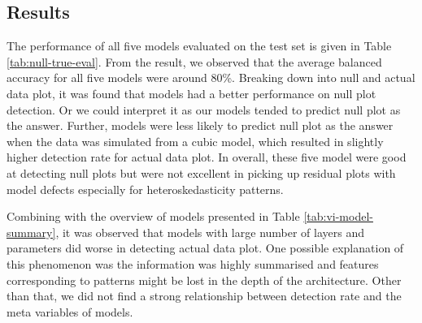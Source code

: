 \documentclass{monashthesis}
\theoremstyle{definition}
\theoremstyle{definition}
\theoremstyle{definition}
\theoremstyle{definition}
\theoremstyle{remark}
\begin{document}
\hypertarget{results-1}{%
\subsection{Results}\label{results-1}}

The performance of all five models evaluated on the test set is given in Table \ref{tab:null-true-eval}. From the result, we observed that the average balanced accuracy for all five models were around 80\%. Breaking down into null and actual data plot, it was found that models had a better performance on null plot detection. Or we could interpret it as our models tended to predict null plot as the answer. Further, models were less likely to predict null plot as the answer when the data was simulated from a cubic model, which resulted in slightly higher detection rate for actual data plot. In overall, these five model were good at detecting null plots but were not excellent in picking up residual plots with model defects especially for heteroskedasticity patterns.

Combining with the overview of models presented in Table \ref{tab:vi-model-summary}, it was observed that models with large number of layers and parameters did worse in detecting actual data plot. One possible explanation of this phenomenon was the information was highly summarised and features corresponding to patterns might be lost in the depth of the architecture. Other than that, we did not find a strong relationship between detection rate and the meta variables of models.
\end{document}
